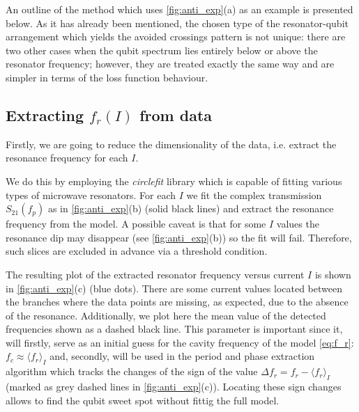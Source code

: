 \documentclass[%
 aip,
 draft,
 amsmath,amssymb,
 reprint,%
]{revtex4-1}
\begin{document}
An outline of the method which uses \autoref{fig:anti_exp}(a) as an example is presented below. As it has already been mentioned, the chosen type of the resonator-qubit arrangement which yields the avoided crossings pattern is not unique: there are two other cases when the qubit spectrum lies entirely below or above the resonator frequency; however, they are treated exactly the same way and are simpler in terms of the loss function behaviour.

\subsection{Extracting $f_r(I)$ from data}\label{sec:extract_fr}

Firstly, we are going to reduce the dimensionality of the data, i.e. extract the resonance frequency for each $I$.

We do this by employing the \textit{circlefit}\cite{probst2015} library which is capable of fitting various types of microwave resonators. For each $I$ we fit the complex transmission $S_{21}(f_p)$ as in \autoref{fig:anti_exp}(b) (solid black lines) and extract the resonance frequency from the model. A possible caveat is that for some $I$ values the resonance dip may disappear (see \autoref{fig:anti_exp}(b)) so the fit will fail. Therefore, such slices are excluded in advance via a threshold condition.

The resulting plot of the extracted resonator frequency versus current $I$ is shown in \autoref{fig:anti_exp}(c) (blue dots). There are some current values located between the branches where the data points are missing, as expected, due to the absence of the resonance. Additionally, we plot here the mean value of the detected frequencies shown as a dashed black line. This parameter is important since it, will firstly, serve as an initial guess for the cavity frequency of the model \eqref{eq:f_r}: $f_c \approx \langle f_r \rangle_{I}$ and, secondly, will be used in the period and phase extraction algorithm which tracks the changes of the sign of the value $\Delta f_r = f_r - \langle f_r \rangle_{I}$ (marked as grey dashed lines in \autoref{fig:anti_exp}(c)). Locating these sign changes allows to find the qubit sweet spot without fittig the full model.
\end{document}
